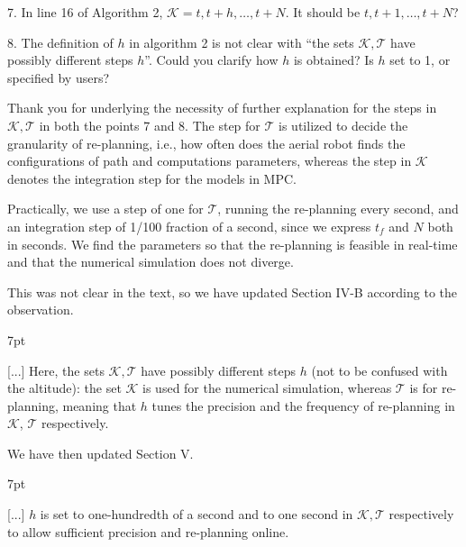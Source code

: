 \documentclass[10pt]{letter}
\newenvironment{formal}{%
  \def\FrameCommand{%
    \hspace{1pt}%
    {\color{red}\vrule width 2pt}%
    {\color{formalshade}\vrule width 4pt}%
    \colorbox{formalshade}%
  }%
  \MakeFramed{\advance\hsize-\width\FrameRestore}%
  \noindent\hspace{-4.55pt}%
  \begin{adjustwidth}{}{7pt}%
  \vspace{2pt}\vspace{2pt}%
}
{%
  \vspace{2pt}\end{adjustwidth}\endMakeFramed%
}
\begin{document}
7. In line 16 of Algorithm 2, $\mathcal{K}={t,t+h,\dots,t+N}$. It should be ${t,t+1,\dots,t+N}$?

8. The definition of $h$ in algorithm 2 is not clear with ``the sets $\mathcal{K},\mathcal{T}$ have possibly different steps $h$''. Could you clarify how $h$ is obtained? Is $h$ set to 1, or specified by users?

{\color{blue} 

{\hspace*{-4.5em}{[R1:13]}\vspace*{-1.9em}}

Thank you for underlying the necessity of further explanation for the steps in $\mathcal{K},\mathcal{T}$ in both the points 7 and 8. The step for $\mathcal{T}$ is utilized to decide the granularity of re-planning, i.e., how often does the aerial robot finds the configurations of path and computations parameters, whereas the step in $\mathcal{K}$ denotes the integration step for the models in MPC.

Practically, we use a step of one for $\mathcal{T}$, running the re-planning every second, and an integration step of 1/100 fraction of a second, since we express $t_f$ and $N$ both in seconds. We find the parameters so that the re-planning is feasible in real-time and that the numerical simulation does not diverge.

This was not clear in the text, so we have updated Section IV-B according to the observation.

\begin{formal}
  \color{black} [...] Here, the sets $\mathcal{K},\mathcal{T}$ have possibly different steps $h$ (not to be confused with the altitude){\color{blue}: 
  the set $\mathcal{K}$ is used for the numerical simulation, whereas $\mathcal{T}$ is for re-planning, meaning that $h$ tunes the precision and the frequency of re-planning in $\mathcal{K}$, $\mathcal{T}$ respectively.}
  \vspace*{1ex}
\end{formal}

We have then updated Section V.


\begin{formal}
  \color{black} [...] {\color{blue} $h$ is set to one-hundredth of a second and to one second in $\mathcal{K}, \mathcal{T}$ respectively to allow sufficient precision and re-planning online.}
  \vspace*{1ex}
\end{formal}


}
\end{document}
